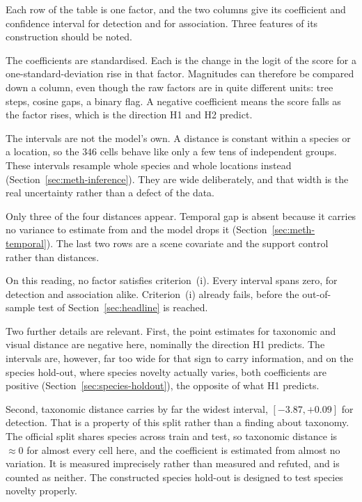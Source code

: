 Each row of the table is one factor, and the two columns give its coefficient and confidence interval for
detection and for association. Three features of its construction should be noted.

The coefficients are standardised. Each is the change in the logit of the score for a one-standard-deviation
rise in that factor. Magnitudes can therefore be compared down a column, even though the raw factors are in
quite different units: tree steps, cosine gaps, a binary flag. A negative coefficient means the score falls
as the factor rises, which is the direction H1 and H2 predict.

The intervals are not the model's own. A distance is constant within a species or a location, so the $346$
cells behave like only a few tens of independent groups. These intervals resample whole species and whole
locations instead (Section~\ref{sec:meth-inference}). They are wide deliberately, and that width is the real
uncertainty rather than a defect of the data.

Only three of the four distances appear. Temporal gap is absent because it carries no variance to estimate
from and the model drops it (Section~\ref{sec:meth-temporal}). The last two rows are a scene covariate and the
support control rather than distances.

On this reading, no factor satisfies criterion~(i). Every interval spans zero, for detection and
association alike. Criterion~(i) already fails, before the out-of-sample test of Section~\ref{sec:headline} is
reached.

Two further details are relevant. First, the point estimates for taxonomic and visual distance are negative
here, nominally the direction H1 predicts. The intervals are, however, far too wide for that sign to carry
information, and on the species hold-out, where species novelty actually varies, both coefficients are
positive (Section~\ref{sec:species-holdout}), the opposite of what H1 predicts.

Second, taxonomic distance carries by far the widest interval, $[-3.87,+0.09]$ for detection. That is a
property of this split rather than a finding about taxonomy. The official split shares species across train and
test, so taxonomic distance is $\approx\!0$ for almost every cell here, and the coefficient is estimated from
almost no variation. It is measured imprecisely rather than measured and refuted, and is counted as neither.
The constructed species hold-out is designed to test species novelty properly.

